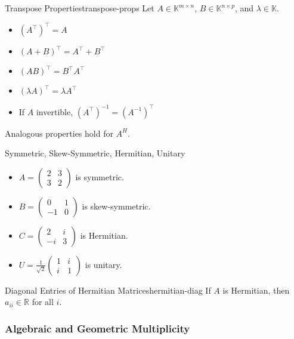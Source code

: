 \begin{property}{Transpose Properties}{transpose-props}
    Let \(A \in \mathbb{K}^{m \times n}\), \(B \in \mathbb{K}^{n \times p}\), and \(\lambda \in \mathbb{K}\).
    \begin{itemize}[nosep]
        \item \((A^\top)^\top = A\)
        \item \((A+B)^\top = A^\top + B^\top\)
        \item \((AB)^\top = B^\top A^\top\)
        \item \((\lambda A)^\top = \lambda A^\top\)
        \item If \(A\) invertible, \((A^\top)^{-1} = (A^{-1})^\top\)
    \end{itemize}
    Analogous properties hold for \(A^H\).
\end{property}

\begin{example}{Symmetric, Skew-Symmetric, Hermitian, Unitary}{}
    \begin{itemize}[nosep]
        \item \(A = \begin{pmatrix}2 & 3\\3 & 2\end{pmatrix}\) is symmetric.
        \item \(B = \begin{pmatrix}0 & 1\\-1 & 0\end{pmatrix}\) is skew-symmetric.
        \item \(C = \begin{pmatrix}2 & i\\-i & 3\end{pmatrix}\) is Hermitian.
        \item \(U = \frac{1}{\sqrt{2}}\begin{pmatrix}1 & i\\i & 1\end{pmatrix}\) is unitary.
    \end{itemize}
\end{example}

\begin{remark}{Diagonal Entries of Hermitian Matrices}{hermitian-diag}
    If \(A\) is Hermitian, then \(a_{ii} \in \mathbb{R}\) for all \(i\).
\end{remark}

\subsubsection{Algebraic and Geometric Multiplicity}

